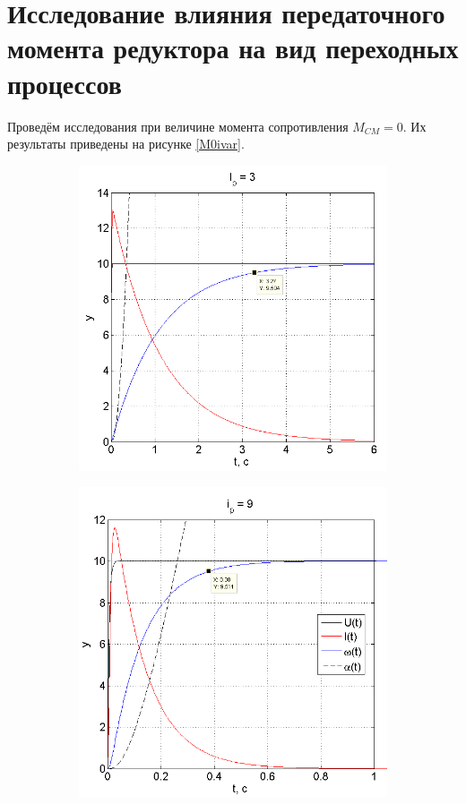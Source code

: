 \documentclass[fleqn, a4paper, 11pt, russian]{article}
\begin{document}
	\section{Исследование влияния передаточного момента редуктора на вид переходных процессов}
	Проведём исследования при величине момента сопротивления $M_{CM} = 0$. Их результаты приведены на рисунке \ref{M0ivar}.
	\begin{figure}[ht!]
		\centering
		\begin{subfigure}[b]{0.49\textwidth}
			\includegraphics[width = \textwidth]{M0i3}
		\end{subfigure}
		\hfill
		\begin{subfigure}[b]{0.49\textwidth}
			\includegraphics[width = \textwidth]{M0i9}
		\end{subfigure}
	\end{figure}
\end{document}
